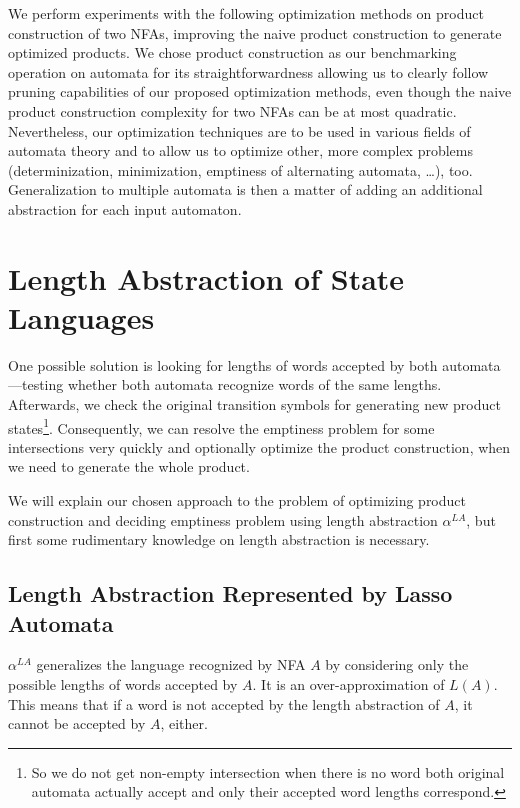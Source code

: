 We perform experiments with the following optimization methods on product construction of two NFAs, improving the naive product construction to generate optimized products. We chose product construction as our benchmarking operation on automata for its straightforwardness allowing us to clearly follow pruning capabilities of our proposed optimization methods, even though the naive product construction complexity for two NFAs can be at most quadratic. Nevertheless, our optimization techniques are to be used in various fields of automata theory and to allow us to optimize other, more complex problems (determinization, minimization, emptiness of alternating automata, \ldots), too. Generalization to multiple automata is then a matter of adding an additional abstraction for each input automaton.


\section{Length Abstraction of State Languages}

One possible solution is looking for lengths of words accepted by both automata---testing whether both automata recognize words of the same lengths. Afterwards, we check the original transition symbols for generating new product states\footnote{So we do not get non-empty intersection when there is no word both original automata actually accept and only their accepted word lengths correspond.}. Consequently, we can resolve the emptiness problem for some intersections very quickly and optionally optimize the product construction, when we need to generate the whole product.

We will explain our chosen approach to the problem of optimizing product construction and deciding emptiness problem using length abstraction $\alpha^{LA}$, but first some rudimentary knowledge on length abstraction is necessary.

\subsection{Length Abstraction Represented by Lasso Automata} \label{sec:length_abstraction}

$\alpha^{LA}$ generalizes the language recognized by NFA $A$ by considering only the possible lengths of words accepted by $A$. It is an over-approximation of $L(A)$. This means that if a word is not accepted by the length abstraction of $A$, it cannot be accepted by $A$, either.

